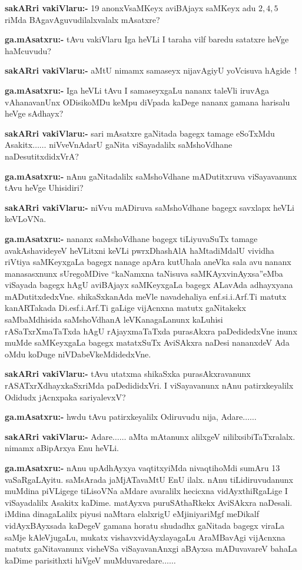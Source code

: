 \smallskip
\noindent
\textbf{sakARri vakiVlaru:-} {\rm 19} anonxVsaMKeyx aviBAjayx saMKeyx adu $2, 4, 5$ riMda BAgavAguvudilalxvalalx mAsatxre?

\smallskip
\noindent
\textbf{ga.mAsatxru:-} tAvu vakiVlaru Iga heVLi I taraha vilf baredu satatxre heVge haMcuvudu?

\smallskip
\noindent
\textbf{sakARri vakiVlaru:-} aMtU nimamx samaseyx nijavAgiyU yoVcisuva hAgide~!

\smallskip
\noindent
\textbf{ga.mAsatxru:-} Iga heVLi tAvu I samaseyxgaLu nananx taleVli iruvAga vAhanavanUnx ODisikoMDu keMpu diVpada kaDege nananx gamana harisalu heVge sAdhayx?

\smallskip
\noindent
\textbf{sakARri vakiVlaru:-} sari mAsatxre gaNitada bagegx tamage eSoTxMdu Asakitx$\ldots\ldots$ niVveVnAdarU gaNita viSayadalilx saMshoVdhane naDesutitxdidxVrA?

\smallskip
\noindent
\textbf{ga.mAsatxru:-} nAnu gaNitadalilx saMshoVdhane mADutitxruva viSayavanunx tAvu heVge Uhisidiri?

\smallskip
\noindent
\textbf{sakARri vakiVlaru:-} niVvu mADiruva saMshoVdhane bagegx savxlapx heVLi keVLoVNa.

\smallskip
\noindent
\textbf{ga.mAsatxru:-} nananx saMshoVdhane bagegx tiLiyuvaSuTx tamage avakAshavideyeV heVLitxni keVLi pwrxDhashAlA haMtadiMdalU vividha riVtiya saMKeyxgaLa bagegx nanage apAra kutUhala aneVka sala avu nananx manasasxnunx sUregoMDive ``kaNamxna taNisuva saMKAyxvinAyxsa''eMba viSayada bagegx hAgU aviBAjayx saMKeyxgaLa bagegx ALavAda adhayxyana mADutitxdedxVne. shikaSxkanAda meVle navadehaliya enf.si.i.Arf.Ti matutx kanARTakada Di.esf.i.Arf.Ti gaLige vijAcnxna matutx gaNitakekx saMbaMdhisida saMshoVdhanA leVKanagaLanunx kaLuhisi rASaTxrXmaTaTxda hAgU rAjayxmaTaTxda purasAkxra paDedidedxVne inunx muMde saMKeyxgaLa bagegx matatxSuTx AviSAkxra naDesi nananxdeV Ada oMdu koDuge niVDabeVkeMdidedxVne.

\smallskip
\noindent
\textbf{sakARri vakiVlaru:-} tAvu utatxma shikaSxka purasAkxravanunx rASATxrXdhayxkaSxriMda paDedididxVri. I viSayavanunx nAnu patirxkeyalilx Odidudx jAcnxpaka sariyalevxV?

\smallskip
\noindent
\textbf{ga.mAsatxru:-} hwdu tAvu patirxkeyalilx Odiruvudu nija, Adare$\ldots\ldots$

\smallskip
\noindent
\textbf{sakARri vakiVlaru:-} Adare$\ldots\ldots$ aMta mAtanunx alilxgeV nililxsibiTaTxralalx. nimamx aBipArxya Enu heVLi.

\smallskip
\noindent
\textbf{ga.mAsatxru:-} nAnu upAdhAyxya vaqtitxyiMda nivaqtihoMdi sumAru {\rm 13} vaSaRgaLAyitu. saMsArada jaMjATavaMtU EnU ilalx. nAnu tiLidiruvudanunx muMdina piVLigege tiLisoVNa aMdare avaralilx hecicxna vidAyxthiRgaLige I viSayadalilx Asakitx kaDime. matAyxva puruSAthaRkekx AviSAkxra naDesali. iMdina dinagaLalilx piyusi naMtara elalxrigU eMjiniyariMgf meDikalf vidAyxBAyxsada kaDegeV gamana horatu shudadhx gaNitada bagegx viraLa saMje kAleVjugaLu, mukatx vishavxvidAyxlayagaLu AraMBavAgi vijAcnxna matutx gaNitavanunx visheVSa viSayavanAnxgi aBAyxsa mADuvavareV bahaLa kaDime parisithxti hiVgeV muMduvaredare$\ldots\ldots$

